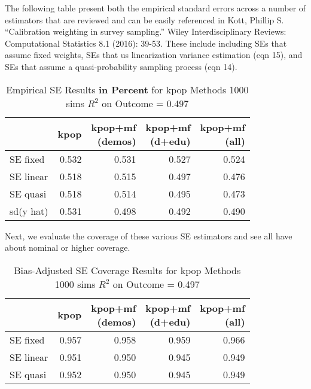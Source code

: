 \documentclass[
]{article}
\begin{document}
The following table present both the empirical standard errors across a
number of estimators that are reviewed and can be easily referenced in
Kott, Phillip S. ``Calibration weighting in survey sampling.'' Wiley
Interdisciplinary Reviews: Computational Statistics 8.1 (2016): 39-53.
These include including SEs that assume fixed weights, SEs that us
linearization variance estimation (eqn 15), and SEs that assume a
quasi-probability sampling process (eqn 14).

\begin{table}[!h]

\caption{\label{tab:SEs}Empirical SE Results \textbf{in Percent} for kpop Methods 1000 sims $R^2$ on Outcome =  0.497}
\centering
\begin{tabular}[t]{lrrrr}
\toprule
  & kpop & \makecell[c]{kpop+mf\\(demos)} & \makecell[r]{kpop+mf\\(d+edu)} & \makecell[l]{kpop+mf\\(all)}\\
\midrule
SE fixed & 0.532 & 0.531 & 0.527 & 0.524\\
SE linear & 0.518 & 0.515 & 0.497 & 0.476\\
SE quasi & 0.518 & 0.514 & 0.495 & 0.473\\
sd(y hat) & 0.531 & 0.498 & 0.492 & 0.490\\
\bottomrule
\end{tabular}
\end{table}

Next, we evaluate the coverage of these various SE estimators and see
all have about nominal or higher coverage.

\begin{table}[!h]

\caption{\label{tab:coverage}Bias-Adjusted SE Coverage Results for kpop Methods 1000 sims $R^2$ on Outcome =  0.497}
\centering
\begin{tabular}[t]{lrrrr}
\toprule
  & kpop & \makecell[c]{kpop+mf\\(demos)} & \makecell[r]{kpop+mf\\(d+edu)} & \makecell[l]{kpop+mf\\(all)}\\
\midrule
SE fixed & 0.957 & 0.958 & 0.959 & 0.966\\
SE linear & 0.951 & 0.950 & 0.945 & 0.949\\
SE quasi & 0.952 & 0.950 & 0.945 & 0.949\\
\bottomrule
\end{tabular}
\end{table}
\end{document}
